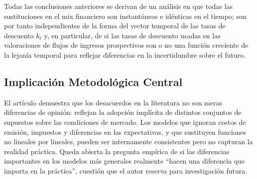 \documentclass[12pt]{article}
\begin{document}
Todas las conclusiones anteriores se derivan de un an\'alisis en que todas las sustituciones en el mix financiero son instant\'aneas e id\'enticas en el tiempo; son por tanto independientes de la forma del vector temporal de las tasas de descuento $k_t$ y, en particular, de si las tasas de descuento usadas en las valoraciones de flujos de ingresos prospectivos son o no una funci\'on creciente de la lejan\'ia temporal para reflejar diferencias en la incertidumbre sobre el futuro.

\subsection*{Implicaci\'on Metodol\'ogica Central}

El art\'iculo demuestra que los desacuerdos en la literatura no son meras diferencias de opini\'on: reflejan la adopci\'on impl\'icita de distintos conjuntos de supuestos sobre las condiciones de mercado. Los modelos que ignoran costos de emisi\'on, impuestos y diferencias en las expectativas, y que sustituyen funciones no lineales por lineales, pueden ser internamente consistentes pero no capturan la realidad pr\'actica. Queda abierta la pregunta emp\'irica de si las diferencias importantes en los modelos m\'as generales realmente ``hacen una diferencia que importa en la pr\'actica'', cuesti\'on que el autor reserva para investigaci\'on futura.
\end{document}
